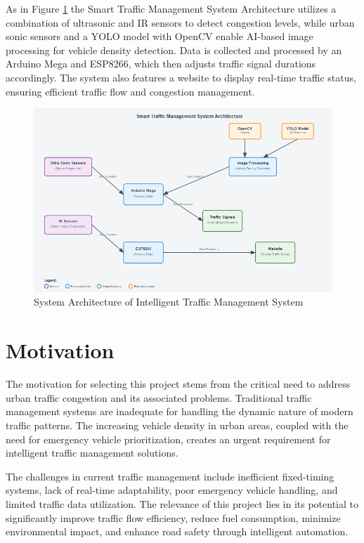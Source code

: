 As in Figure \ref{fig:system_architecture} the Smart Traffic Management System Architecture utilizes a combination of ultrasonic and IR sensors to detect congestion levels, while urban sonic sensors and a YOLO model with OpenCV enable AI-based image processing for vehicle density detection. Data is collected and processed by an Arduino Mega and ESP8266, which then adjusts traffic signal durations accordingly. The system also features a website to display real-time traffic status, ensuring efficient traffic flow and congestion management. 
\begin{figure}[htb]
\centering
	\includegraphics[scale=1]{Figures/system_architecture.png}	
	\caption{System Architecture of Intelligent Traffic Management System}
	\label{fig:system_architecture}
\end{figure}

\section[Motivation]{\textbf{Motivation}}

The motivation for selecting this project stems from the critical need to address urban traffic congestion and its associated problems. Traditional traffic management systems are inadequate for handling the dynamic nature of modern traffic patterns. The increasing vehicle density in urban areas, coupled with the need for emergency vehicle prioritization, creates an urgent requirement for intelligent traffic management solutions.

The challenges in current traffic management include inefficient fixed-timing systems, lack of real-time adaptability, poor emergency vehicle handling, and limited traffic data utilization. The relevance of this project lies in its potential to significantly improve traffic flow efficiency, reduce fuel consumption, minimize environmental impact, and enhance road safety through intelligent automation.

